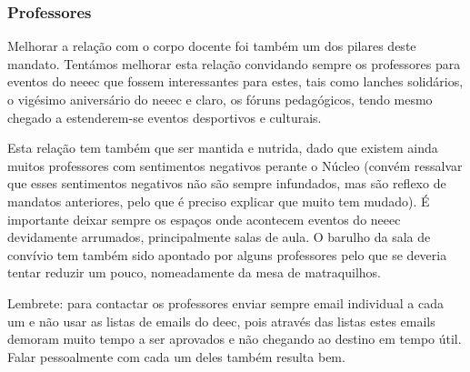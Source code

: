 
\subsubsection{Professores}

Melhorar a relação com o corpo docente foi também um dos pilares deste mandato. Tentámos melhorar esta relação convidando sempre os professores para eventos do \acrshort{neeec} que fossem interessantes para estes, tais como lanches solidários, o vigésimo aniversário do \acrshort{neeec} e claro, os fóruns pedagógicos, tendo mesmo chegado a estenderem-se eventos desportivos e culturais.

Esta relação tem também que ser mantida e nutrida, dado que existem ainda muitos professores com sentimentos negativos perante o Núcleo (convém ressalvar que esses sentimentos negativos não são sempre infundados, mas são reflexo de mandatos anteriores, pelo que é preciso explicar que muito tem mudado). É importante deixar sempre os espaços onde acontecem eventos do \acrshort{neeec} devidamente arrumados, principalmente salas de aula. O barulho da sala de convívio tem também sido apontado por alguns professores pelo que se deveria tentar reduzir um pouco, nomeadamente da mesa de matraquilhos.

Lembrete: para contactar os professores enviar sempre email individual a cada um e não usar as listas de emails do \acrshort{deec}, pois através das listas estes emails demoram muito tempo a ser aprovados e não chegando ao destino em tempo útil. Falar pessoalmente com cada um deles também resulta bem.